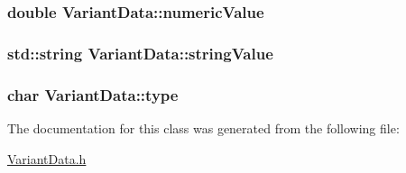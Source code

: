 \hypertarget{classVariantData_2c126081da9af039f2a928eb1d0431c9}{
\subsubsection[{numericValue}]{\setlength{\rightskip}{0pt plus 5cm}double {\bf VariantData::numericValue}}}
\label{classVariantData_2c126081da9af039f2a928eb1d0431c9}


\hypertarget{classVariantData_b6149a1e20119b6ba877f7c6b43551e9}{
\subsubsection[{stringValue}]{\setlength{\rightskip}{0pt plus 5cm}std::string {\bf VariantData::stringValue}}}
\label{classVariantData_b6149a1e20119b6ba877f7c6b43551e9}


\hypertarget{classVariantData_c93d42bf9dd34df412312f2c29767aad}{
\subsubsection[{type}]{\setlength{\rightskip}{0pt plus 5cm}char {\bf VariantData::type}}}
\label{classVariantData_c93d42bf9dd34df412312f2c29767aad}




The documentation for this class was generated from the following file:\begin{CompactItemize}
\item 
\hyperlink{VariantData_8h}{VariantData.h}\end{CompactItemize}
